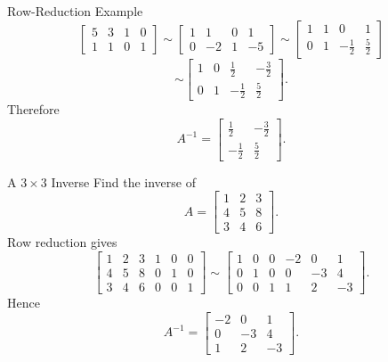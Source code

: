 \begin{frame}{Row-Reduction Example}
\small
\[
\left[\begin{array}{cc|cc}5&3&1&0\\1&1&0&1\end{array}\right]
\sim
\left[\begin{array}{cc|cc}1&1&0&1\\0&-2&1&-5\end{array}\right]
\sim
\left[\begin{array}{cc|cc}1&1&0&1\\0&1&-\frac12&\frac52\end{array}\right]
\]
\[
\sim
\left[\begin{array}{cc|cc}
1&0&\frac12&-\frac32\\
0&1&-\frac12&\frac52
\end{array}\right].
\]
Therefore
\[
A^{-1}=
\begin{bmatrix}
\frac12&-\frac32\\[.3ex]
-\frac12&\frac52
\end{bmatrix}.
\]
\end{frame}

\begin{frame}[shrink=7]{A $3\times3$ Inverse}
Find the inverse of
\[
A=\begin{bmatrix}1&2&3\\4&5&8\\3&4&6\end{bmatrix}.
\]
Row reduction gives
\[
\left[\begin{array}{ccc|ccc}
1&2&3&1&0&0\\
4&5&8&0&1&0\\
3&4&6&0&0&1
\end{array}\right]
\sim
\left[\begin{array}{ccc|ccc}
1&0&0&-2&0&1\\
0&1&0&0&-3&4\\
0&0&1&1&2&-3
\end{array}\right].
\]
Hence
\[
A^{-1}=\begin{bmatrix}-2&0&1\\0&-3&4\\1&2&-3\end{bmatrix}.
\]
\end{frame}

